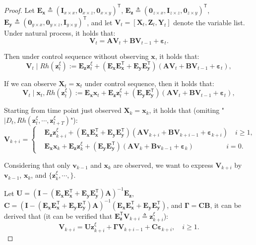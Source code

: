 \documentclass{article}
\theoremstyle{plain}
\theoremstyle{definition}
\theoremstyle{remark}
\def \x {\mathbf{x}}
\def \Z {\mathbf{Z}}
\def \E {\mathbf{E}}
\def \V {\mathbf{V}}
\def \X {\mathbf{X}}
\def \Y {\mathbf{Y}}
\def \I {\mathbf{I}}
\def \U {\mathbf{U}}
\def \A {\mathbf{A}}
\def \V {\mathbf{V}}
\def \B {\mathbf{B}}
\def \C {\mathbf{C}}
\def \v {\mathbf{v}}
\def \y {\mathbf{y}}
\def \z {\mathbf{z}}
\begin{document}
\begin{proof}

Let \(\E_\x\triangleq\left(\I_{x\times x}, \bm{0}_{x\times z}, \bm{0}_{x\times y}\right)^\mathsf{T}\), \(\E_\z\triangleq\left(\bm{0}_{z\times x}, \I_{z\times z}, \bm{0}_{z\times y}\right)^\mathsf{T}\), \(\E_\y\triangleq\left(\bm{0}_{y\times x}, \bm{0}_{y\times z}, \I_{y\times y}\right)^\mathsf{T}\), and let \(\V_t = [\X_t, \Z_t, \Y_t]\) denote the variable list. Under natural process, it holds that: 
\[
  \V_{t} = \A\V_{t} + \B\V_{t-1} + \bm{\varepsilon}_t.
\]

Then under control sequence without observing \(\x\), it holds that:
\[
  \V_{t} \mid Rh(\z_t^\xi) := \E_\z\z_t^\xi + \left(\E_\x\E_\x^\mathsf{T} + \E_\y\E_\y^\mathsf{T}\right)\left(\A\V_{t} + \B\V_{t-1} +\bm{\varepsilon}_t\right), 
\]


If we can observe \(\X_t = \x_t\) under control sequence, then it holds that:
\[
  \V_{t} \mid \x_t, Rh(\z_t^\xi) := \E_\x\x_t + \E_\z\z_t^\xi + \left(\E_\y\E_\y^\mathsf{T}\right)\left(\A\V_{t} + \B\V_{t-1} +\bm{\varepsilon}_t\right), 
\]

Starting from time point just observed \(\X_k = \x_k\), it holds that (omiting "\(\mid D_t, Rh(\z_t^\xi, \cdots, \z_{t+T}^\xi)\)"):
\begin{equation}
  \label{eq:iter}
  \V_{k+i} =
  \left\{
    \begin{aligned}
      & \E_\z\z_{k+i}^\xi + \left(\E_\x\E_\x^\mathsf{T} + \E_\y\E_\y^\mathsf{T}\right)\left(\A\V_{k+i} + \B\V_{k+i-1} +\bm{\varepsilon}_{k+i}\right)\quad i\geq 1, \\
      & \E_\x\x_k + \E_\z\z_k^\xi + \left(\E_\y\E_\y^\mathsf{T}\right)\left(\A\V_{k} + \B\v_{k-1} +\bm{\varepsilon}_k\right)\quad\quad\quad\quad\ \ \  i = 0.
    \end{aligned}
  \right.
\end{equation}

Considering that only \(\v_{k-1}\) and \(\x_k\) are observed, we want to express \(\V_{k+i}\) by \(\v_{k-1}\), \(\x_k\), and \(\{\z_k^\xi, \cdots, \}\). 

Let \(\U=\left(\I-\left(\E_\x\E_\x^\mathsf{T} + \E_\y\E_\y^\mathsf{T}\right)\A\right)^{-1}\E_\z\), \(\C=\left(\I-\left(\E_\x\E_\x^\mathsf{T} + \E_\y\E_\y^\mathsf{T}\right)\A\right)^{-1}\left(\E_\x\E_\x^\mathsf{T} + \E_\y\E_\y^\mathsf{T}\right)\), and \(\bm{\Gamma}=\C\B\), it can be derived that (it can be verified that \(\E_\z^\mathsf{T}\V_{k+i}\triangleq \z_{k+i}^\xi\)):
\[
  \V_{k+i} = \U\z_{k+i}^\xi + \bm{\Gamma}\V_{k+i-1} +  \C\bm{\varepsilon}_{k+i}, \quad i\geq 1.
\]


\end{proof}
\end{document}
